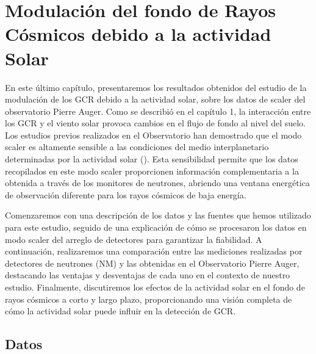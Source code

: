 
\newpage
\chapter{Modulación del fondo de Rayos Cósmicos debido a la actividad Solar}

En este último capítulo, presentaremos los resultados obtenidos del estudio de la modulación de los GCR debido a la actividad solar, sobre los datos de scaler del observatorio Pierre Auger. Como se describió en el capítulo 1, la interacción entre los GCR y el viento solar provoca cambios en el flujo de fondo al nivel del suelo.  Los estudios previos realizados en el Observatorio han demostrado que el modo scaler es altamente sensible a las condiciones del medio interplanetario determinadas por la actividad solar (\cite{Martin_Schimassek2022}). Esta sensibilidad permite que los datos recopilados en este modo scaler proporcionen información complementaria a la obtenida a través de los monitores de neutrones, abriendo una ventana energética de observación diferente para los rayos cósmicos de baja energía.

Comenzaremos con una descripción de los datos y las fuentes que hemos utilizado para este estudio, seguido de una explicación de cómo se procesaron los datos en modo scaler del arreglo de detectores para garantizar la fiabilidad. A continuación, realizaremos una comparación entre las mediciones realizadas por detectores de neutrones (NM) y las obtenidas en el Observatorio Pierre Auger, destacando las ventajas y desventajas de cada uno en el contexto de nuestro estudio. Finalmente, discutiremos los efectos de la actividad solar en el fondo de rayos cósmicos a corto y largo plazo, proporcionando una visión completa de cómo la actividad solar puede influir en la detección de GCR.

\section{Datos}

